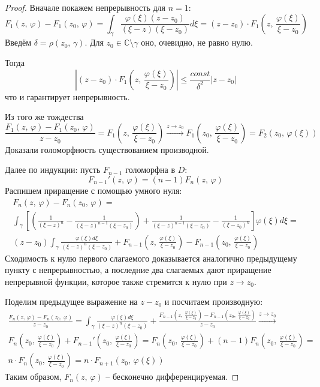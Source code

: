 \documentclass[a4paper,12pt]{article}
\renewcommand{\phi}{\ensuremath{\varphi}}
\renewcommand{\leq}{\ensuremath{\leqslant}}
\theoremstyle{plain}
\theoremstyle{definition}
\theoremstyle{remark}
\begin{document}
\begin{proof}
  Вначале покажем непрерывность для $n = 1$:
  \[
    F_1(z,\, \phi) - F_1(z_0,\, \phi) = \int_\gamma\frac{\phi(\xi)(z - z_0)}{(\xi - z)(\xi - z_0)}d\xi = (z - z_0)\cdot F_1\left(z,\, \frac{\phi(\xi)}{\xi - z_0}\right)
  \]
  Введём $\delta = \rho(z_0,\, \gamma)$. Для $z_0 \in \mathbb{C}\setminus \gamma$ оно, очевидно, не равно нулю.

  Тогда
  \[
    \left\vert (z - z_0)\cdot F_1\left(z,\, \frac{\phi(\xi)}{\xi - z_0}\right)\right\vert \leq \frac{const}{\delta^2}\vert z - z_0\vert
  \]
  что и гарантирует непрерывность.

  Из того же тождества
  \[
    \frac{F_1(z,\, \phi) - F_1(z_0,\, \phi)}{z - z_0} = F_1\left(z,\, \frac{\phi(\xi)}{\xi - z_0}\right) \overset{z \to z_0}{\to} F_1\left(z_0,\, \frac{\phi(\xi)}{\xi - z_0}\right) = F_2(z_0,\, \phi(\xi))
  \]
  Доказали голоморфность существованием производной.

  Далее по индукции: пусть $F_{n - 1}$ голоморфна в $D$:
  \[
    F_{n - 1}'(z,\, \phi) = (n - 1)F_n(z,\, \phi)
  \]
  Распишем приращение с помощью умного нуля:
  \begin{align*}
    F_n(z,\, \phi) - F_n(z_0,\, \phi) =\\
    \int_\gamma\left[\left(\frac{1}{(\xi - z)^n} - \frac{1}{(\xi - z)^{n - 1}(\xi - z_0)}\right) + \frac{1}{(\xi - z)^{n - 1}(\xi - z_0)} - \frac{1}{(\xi - z_0)^n}\right]\phi(\xi)d\xi =\\
    (z - z_0)\int_\gamma\frac{\phi(\xi)d\xi}{(\xi - z)^n(\xi - z_0)} + F_{n - 1}\left(z,\, \frac{\phi(\xi)}{\xi - z_0}\right) - F_{n-1}\left(z_0,\, \frac{\phi(\xi)}{\xi - z_0}\right)
  \end{align*}
  Сходимость к нулю первого слагаемого доказывается аналогично предыдущему пункту с непрерывностью, а последние два слагаемых дают приращение непрерывной функции, которое также стремится к нулю при $z \to z_0$.

  Поделим предыдущее выражение на $z - z_0$ и посчитаем производную:
  \begin{align*}
    \frac{F_n(z,\, \phi) - F_n(z_0,\, \phi)}{z - z_0} = \int_\gamma\frac{\phi(\xi)d\xi}{(\xi - z)^n(\xi - z_0)} + \frac{F_{n - 1}\left(z,\, \frac{\phi(\xi)}{\xi - z_0}\right) - F_{n-1}\left(z_0,\, \frac{\phi(\xi)}{\xi - z_0}\right)}{z - z_0} \overset{z \to z_0}{\to} \\
    F_n\left(z_0,\, \frac{\phi(\xi)}{\xi - z_0}\right) + F_{n - 1}'\left(z_0,\, \frac{\phi(\xi)}{\xi - z_0}\right) = F_n\left(z_0,\, \frac{\phi(\xi)}{\xi - z_0}\right) + (n-1)F_n\left(z_0,\, \frac{\phi(\xi)}{\xi - z_0}\right) = \\
    n\cdot F_n\left(z_0,\, \frac{\phi(\xi)}{\xi - z_0}\right) = n\cdot F_{n + 1}(z_0,\, \phi(\xi))
  \end{align*}
  Таким образом, $F_n(z,\, \phi)$ -- бесконечно дифференцируемая.
\end{proof}
\end{document}

